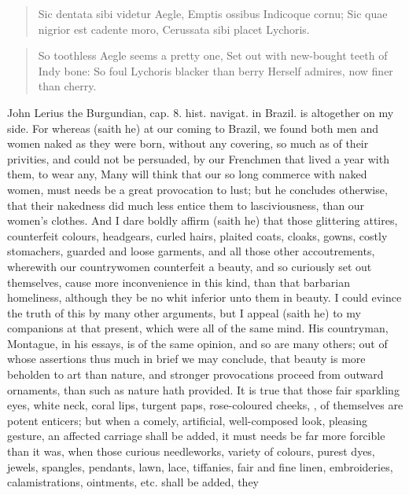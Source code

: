 \begin{latin}
\begin{verse}%
Sic dentata sibi videtur Aegle,
Emptis ossibus Indicoque cornu;
Sic quae nigrior est cadente moro,
Cerussata sibi placet Lychoris.
\end{verse}%
\end{latin}
\translationrule%
\begin{verse}%
So toothless Aegle seems a pretty one,
Set out with new-bought teeth of Indy bone:
So foul Lychoris blacker than berry
Herself admires, now finer than cherry.
\end{verse}%

John Lerius the Burgundian, cap. 8. hist. navigat. in Brazil. is
altogether on my side. For whereas (saith he) at our coming to Brazil,
we found both men and women naked as they were born, without any
covering, so much as of their privities, and could not be persuaded, by
our Frenchmen that lived a year with them, to wear any, Many will
think that our so long commerce with naked women, must needs be a great
provocation to lust; but he concludes otherwise, that their nakedness
did much less entice them to lasciviousness, than our women's clothes.
And I dare boldly affirm (saith he) that those glittering attires,
counterfeit colours, headgears, curled hairs, plaited coats, cloaks,
gowns, costly stomachers, guarded and loose garments, and all those
other accoutrements, wherewith our countrywomen counterfeit a beauty,
and so curiously set out themselves, cause more inconvenience in this
kind, than that barbarian homeliness, although they be no whit inferior
unto them in beauty. I could evince the truth of this by many other
arguments, but I appeal (saith he) to my companions at that present,
which were all of the same mind. His countryman, Montague, in his
essays, is of the same opinion, and so are many others; out of whose
assertions thus much in brief we may conclude, that beauty is more
beholden to art than nature, and stronger provocations proceed from
outward ornaments, than such as nature hath provided. It is true that
those fair sparkling eyes, white neck, coral lips, turgent paps,
rose-coloured cheeks, \etc{}, of themselves are potent enticers; but when
a comely, artificial, well-composed look, pleasing gesture, an affected
carriage shall be added, it must needs be far more forcible than it
was, when those curious needleworks, variety of colours, purest dyes,
jewels, spangles, pendants, lawn, lace, tiffanies, fair and fine linen,
embroideries, calamistrations, ointments, etc. shall be added, they

